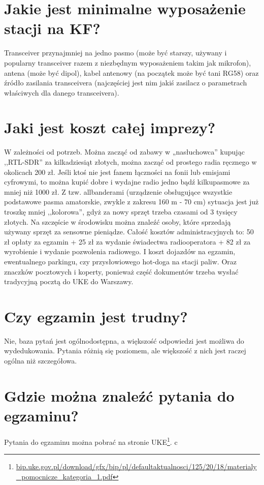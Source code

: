 \documentclass[a4paper,12pt]{article}
\begin{document}
\section{Jakie jest minimalne wyposażenie stacji na KF?}
Transceiver przynajmniej na jedno pasmo (może być starszy, używany i popularny transceiver razem z niezbędnym wyposażeniem takim jak mikrofon), antena (może być dipol), kabel antenowy (na początek może być tani RG58) oraz źródło zasilania transceivera (najczęściej jest nim jakiś zasilacz o parametrach właściwych dla danego transceivera).

\section{Jaki jest koszt całej imprezy?}
W zależności od potrzeb. Można zacząć od zabawy w „nasłuchowca” kupując ,,RTL-SDR'' za kilkadziesiąt złotych, można zacząć od prostego radia ręcznego w okolicach 200 zł. Jeśli ktoś nie jest fanem łączności na fonii lub emisjami cyfrowymi, to można kupić dobre i wydajne radio jedno bądź kilkupasmowe za mniej niż 1000 zł. Z tzw. allbanderami (urządzenie obsługujące wszystkie podstawowe pasma amatorskie, zwykle z zakresu 160 m - 70 cm) sytuacja jest już troszkę mniej ,,kolorowa'', gdyż za nowy sprzęt trzeba czasami od 3 tysięcy złotych. Na szczęście w środowisku można znaleźć osoby, które sprzedają używany sprzęt za sensowne pieniądze.
Całość kosztów administracyjnych to: 50 zł opłaty za egzamin + 25 zł za wydanie świadectwa radiooperatora + 82 zł za wyrobienie i wydanie pozwolenia radiowego. I koszt dojazdów na egzamin, ewentualnego parkingu, czy przysłowiowego hot-doga na stacji paliw. Oraz znaczków pocztowych i koperty, ponieważ część dokumentów trzeba wysłać tradycyjną pocztą do UKE do Warszawy.

\section{Czy egzamin jest trudny?}
Nie, baza pytań jest ogólnodostępna, a większość odpowiedzi jest możliwa do wydedukowania. Pytania różnią się poziomem, ale większość z nich jest raczej ogólna niż szczegółowa.

\section{Gdzie można znaleźć pytania do egzaminu?}
Pytania do egzaminu można pobrać na stronie UKE\footnote{\url{bip.uke.gov.pl/download/gfx/bip/pl/defaultaktualnosci/125/20/18/materialy_pomocnicze_kategoria_1.pdf}}.
c
\end{document}

